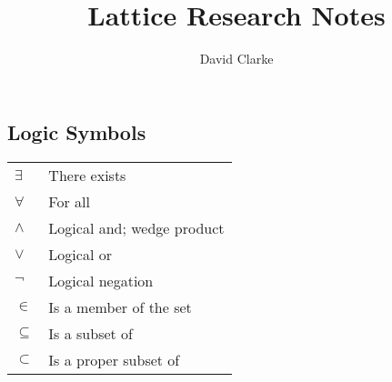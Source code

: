 \documentclass[12pt]{book}
\title{\bf Lattice Research Notes}
\author{David Clarke}
\theoremstyle{definition}
\newenvironment{frontstuff}
  {\centering\chapter*{}}
  {\clearpage}
\begin{document}
\frontmatter                            %
\maketitle                              %


\begin{frontstuff} %


\section*{Logic Symbols}
\begin{tabular}{ll}
$\exists$       & There exists \\
$\forall$       & For all \\
$\wedge$        & Logical and; wedge product \\
$\lor$          & Logical or \\ 
$\neg$          & Logical negation \\
$\in$           & Is a member of the set \\
$\subseteq$     & Is a subset of \\ 
$\subset$     & Is a proper subset of \\ 
\end{tabular}
\clearpage



\end{frontstuff}
\end{document}
